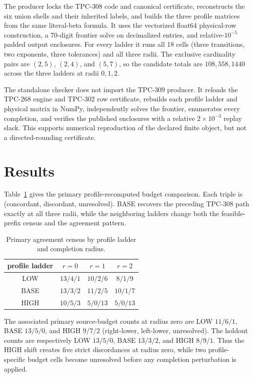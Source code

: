 \documentclass[11pt]{article}
\begin{document}
The producer locks the TPC-308 code and canonical certificate, reconstructs
the six union shells and their inherited labels, and builds the three profile
matrices from the same literal-beta formula.  It uses the vectorized float64
physical-row construction, a 70-digit frontier solve on decimalized entries,
and relative-$10^{-5}$ padded output enclosures.  For every ladder it runs
all 18 cells (three transitions, two exponents, three tolerances) and all
three radii.  The exclusive cardinality pairs are $(2,5)$, $(2,4)$, and
$(5,7)$, so the candidate totals are $108,558,1440$ across the three ladders
at radii $0,1,2$.

The standalone checker does not import the TPC-309 producer.  It reloads the
TPC-268 engine and TPC-302 row certificate, rebuilds each profile ladder and
physical matrix in NumPy, independently solves the frontier, enumerates every
completion, and verifies the published enclosures with a relative
$2\times10^{-3}$ replay slack.  This supports numerical reproduction of the
declared finite object, but not a directed-rounding certificate.

\section{Results}

Table~\ref{tab:agreement} gives the primary profile-recomputed budget
comparison.  Each triple is (concordant, discordant, unresolved).  BASE
recovers the preceding TPC-308 path exactly at all three radii, while the
neighboring ladders change both the feasible-prefix census and the agreement
pattern.

\begin{table}[t]
\centering\small
\caption{Primary agreement census by profile ladder and completion radius.}
\label{tab:agreement}
\begin{tabular}{c c c c}
\toprule
profile ladder & $r=0$ & $r=1$ & $r=2$\\
\midrule
LOW  & $13/4/1$ & $10/2/6$ & $8/1/9$\\
BASE & $13/3/2$ & $11/2/5$ & $10/1/7$\\
HIGH & $10/5/3$ & $5/0/13$ & $5/0/13$\\
\bottomrule
\end{tabular}
\end{table}

The associated primary source-budget counts at radius zero are
LOW $11/6/1$, BASE $13/5/0$, and HIGH $9/7/2$ (right-lower,
left-lower, unresolved).  The holdout counts are respectively
LOW $13/5/0$, BASE $13/3/2$, and HIGH $8/9/1$.  Thus the HIGH shift creates
five strict discordances at radius zero, while two profile-specific budget
cells become unresolved before any completion perturbation is applied.
\end{document}
